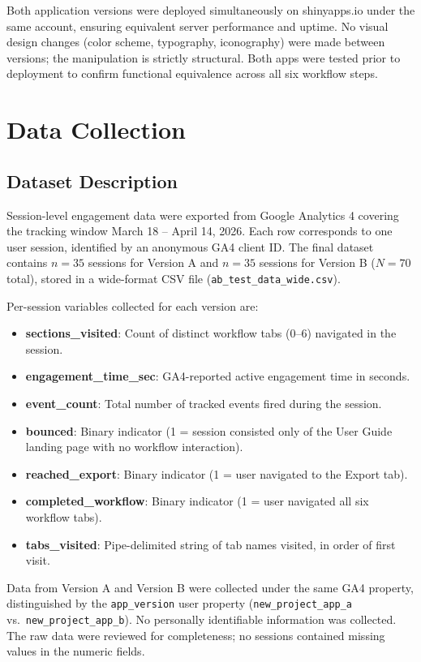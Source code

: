 \documentclass{article}
\begin{document}
                        Both application versions were deployed simultaneously on shinyapps.io under the same account, ensuring equivalent server performance and uptime. No visual design changes (color scheme, typography, iconography) were made between versions; the manipulation is strictly structural. Both apps were tested prior to deployment to confirm functional equivalence across all six workflow steps.

\section{Data Collection}

\subsection{Dataset Description}

Session-level engagement data were exported from Google Analytics 4 covering the tracking window March 18 -- April 14, 2026. Each row corresponds to one user session, identified by an anonymous GA4 client ID. The final dataset contains $n = 35$ sessions for Version A and $n = 35$ sessions for Version B ($N = 70$ total), stored in a wide-format CSV file (\texttt{ab\_test\_data\_wide.csv}).

Per-session variables collected for each version are:

\begin{itemize}
    \item \textbf{sections\_visited}: Count of distinct workflow tabs (0--6) navigated in the session.
    \item \textbf{engagement\_time\_sec}: GA4-reported active engagement time in seconds.
    \item \textbf{event\_count}: Total number of tracked events fired during the session.
    \item \textbf{bounced}: Binary indicator (1 = session consisted only of the User Guide landing page with no workflow interaction).
    \item \textbf{reached\_export}: Binary indicator (1 = user navigated to the Export tab).
    \item \textbf{completed\_workflow}: Binary indicator (1 = user navigated all six workflow tabs).
    \item \textbf{tabs\_visited}: Pipe-delimited string of tab names visited, in order of first visit.
\end{itemize}

Data from Version A and Version B were collected under the same GA4 property, distinguished by the \texttt{app\_version} user property (\texttt{new\_project\_app\_a} vs.\ \texttt{new\_project\_app\_b}).  No personally identifiable information was collected. The raw data were reviewed for completeness; no sessions contained missing values in the numeric fields.
\end{document}
